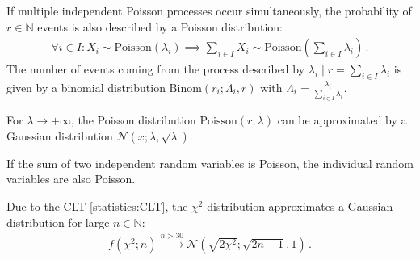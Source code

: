     \begin{formula}
        If multiple independent Poisson processes occur simultaneously, the probability of $r\in\mathbb{N}$ events is also described by a Poisson distribution:
        \begin{gather}
            \forall i\in I:X_i\sim\mathrm{Poisson}(\lambda_i)\implies\sum_{i\in I}X_i\sim\mathrm{Poisson}\left(\sum_{i\in I}\lambda_i\right)\,.
        \end{gather}
        The number of events coming from the process described by $\lambda_i\mid r=\sum_{i\in I}\lambda_i$ is given by a binomial distribution $\mathrm{Binom}(r_i;\Lambda_i,r)$ with $\Lambda_i = \frac{\lambda_i}{\sum_{i\in I}\lambda_i}$.
    \end{formula}
    \begin{remark}
        For $\lambda\longrightarrow+\infty$, the Poisson distribution $\mathrm{Poisson}(r;\lambda)$ can be approximated by a Gaussian distribution $\mathcal{N}(x;\lambda,\sqrt{\lambda})$.
    \end{remark}
    \begin{theorem}[Raikov]
        If the sum of two independent random variables is Poisson, the individual random variables are also Poisson.
    \end{theorem}

    \begin{property}
        Due to the CLT \ref{statistics:CLT}, the $\chi^2$-distribution approximates a Gaussian distribution for large $n\in\mathbb{N}$:
        \begin{gather}
            f(\chi^2;n)\overset{n>30}{\longrightarrow}\mathcal{N}(\sqrt{2\chi^2};\sqrt{2n-1},1)\,.
        \end{gather}
    \end{property}

